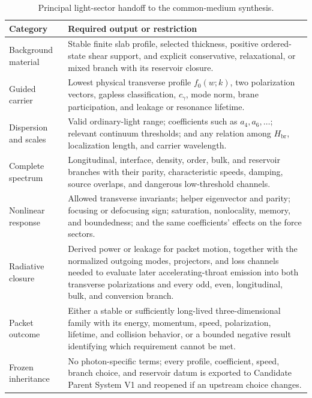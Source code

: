 \begin{table}[htbp]
\centering
\caption{Principal light-sector handoff to the common-medium synthesis.}
\label{tab:light-handoff}
\begin{tabularx}{\textwidth}{@{}L{0.27\textwidth}X@{}}
\toprule
\textbf{Category} & \textbf{Required output or restriction} \\
\midrule
Background material
& Stable finite slab profile, selected thickness, positive ordered-state shear
  support, and explicit conservative, relaxational, or mixed branch with its
  reservoir closure. \\
Guided carrier
& Lowest physical transverse profile \(f_0(w;k)\), two polarization vectors,
  gapless classification, \(c_\gamma\), mode norm, brane participation, and
  leakage or resonance lifetime. \\
Dispersion and scales
& Valid ordinary-light range; coefficients such as \(a_4,a_6,\ldots\); relevant
  continuum thresholds; and any relation among \(H_{\mathrm{br}}\), localization
  length, and carrier wavelength. \\
Complete spectrum
& Longitudinal, interface, density, order, bulk, and reservoir branches with
  their parity, characteristic speeds, damping, source overlaps, and dangerous
  low-threshold channels. \\
Nonlinear response
& Allowed transverse invariants; helper eigenvector and parity; focusing or
  defocusing sign; saturation, nonlocality, memory, and boundedness; and the
  same coefficients' effects on the force sectors. \\
Radiative closure
& Derived power or leakage for packet motion, together with the normalized
  outgoing modes, projectors, and loss channels needed to evaluate later
  accelerating-throat emission into both transverse polarizations and every
  odd, even, longitudinal, bulk, and conversion branch. \\
Packet outcome
& Either a stable or sufficiently long-lived three-dimensional family with its
  energy, momentum, speed, polarization, lifetime, and collision behavior, or a
  bounded negative result identifying which requirement cannot be met. \\
Frozen inheritance
& No photon-specific terms; every profile, coefficient, speed, branch choice,
  and reservoir datum is exported to Candidate Parent System V1 and reopened if
  an upstream choice changes. \\
\bottomrule
\end{tabularx}
\end{table}

